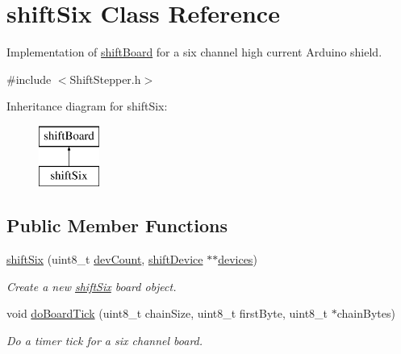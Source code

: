 \hypertarget{classshift_six}{
\section{shiftSix Class Reference}
\label{classshift_six}
}


Implementation of \hyperlink{classshift_board}{shiftBoard} for a six channel high current Arduino shield.  




{\ttfamily \#include $<$ShiftStepper.h$>$}

Inheritance diagram for shiftSix:\begin{figure}[H]
\begin{center}
\leavevmode
\includegraphics[height=2.000000cm]{classshift_six}
\end{center}
\end{figure}
\subsection*{Public Member Functions}
\begin{DoxyCompactItemize}
\item 
\hyperlink{classshift_six_a061ead17cbd393a561fa54146358c627}{shiftSix} (uint8\_\-t \hyperlink{classshift_board_ae7bba07850ced1219dcf67cab33de929}{devCount}, \hyperlink{classshift_device}{shiftDevice} $\ast$$\ast$\hyperlink{classshift_board_a07a2549714f7064fa5e48ec63fdb5efb}{devices})
\begin{DoxyCompactList}\small\item\em Create a new \hyperlink{classshift_six}{shiftSix} board object. \item\end{DoxyCompactList}\item 
void \hyperlink{classshift_six_aa69539cff7e19873a7d37e640632e966}{doBoardTick} (uint8\_\-t chainSize, uint8\_\-t firstByte, uint8\_\-t $\ast$chainBytes)
\begin{DoxyCompactList}\small\item\em Do a timer tick for a six channel board. \item\end{DoxyCompactList}\end{DoxyCompactItemize}


